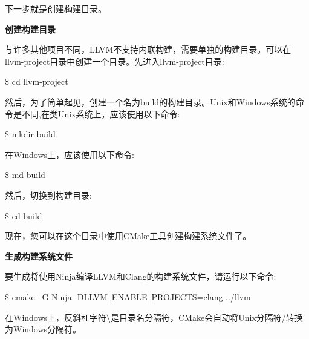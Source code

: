 下一步就是创建构建目录。\par

\hspace*{\fill} \par %
\textbf{创建构建目录}

与许多其他项目不同，LLVM不支持内联构建，需要单独的构建目录。可以在llvm-project目录中创建一个目录。先进入llvm-project目录:\par

\begin{tcolorbox}[colback=white,colframe=black]
\$ cd llvm-project
\end{tcolorbox}

然后，为了简单起见，创建一个名为build的构建目录。Unix和Windows系统的命令是不同,在类Unix系统上，应该使用以下命令:\par

\begin{tcolorbox}[colback=white,colframe=black]
\$ mkdir build
\end{tcolorbox}

在Windows上，应该使用以下命令:\par

\begin{tcolorbox}[colback=white,colframe=black]
\$ md build
\end{tcolorbox}

然后，切换到构建目录:\par

\begin{tcolorbox}[colback=white,colframe=black]
\$ cd build
\end{tcolorbox}

现在，您可以在这个目录中使用CMake工具创建构建系统文件了。\par

\hspace*{\fill} \par %
\textbf{生成构建系统文件}

要生成将使用Ninja编译LLVM和Clang的构建系统文件，请运行以下命令:\par

\begin{tcolorbox}[colback=white,colframe=black]
\$ cmake –G Ninja -DLLVM\underline{~}ENABLE\underline{~}PROJECTS=clang ../llvm
\end{tcolorbox}

\begin{tcolorbox}[colback=blue!5!white,colframe=blue!75!black,title=Tip]
在Windows上，反斜杠字符$\setminus$是目录名分隔符，CMake会自动将Unix分隔符/转换为Windows分隔符。
\end{tcolorbox}


